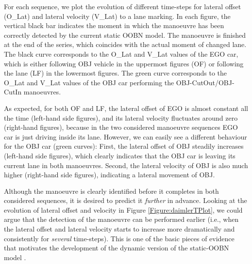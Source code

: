 For each sequence, we plot the evolution of different time-steps for lateral offset (O\_Lat) and lateral velocity (V\_Lat) to a lane marking. In each figure, the vertical black bar indicates the moment in which the manoeuvre has been correctly detected by the current static OOBN model. The manoeuvre is finished at the end of the series, which coincides with the actual moment of changed lane. The black curve corresponds to the O\_Lat and V\_Lat values of the EGO car, which is either following OBJ vehicle in the uppermost figures (OF) or following the lane (LF) in the lowermost figures. The green curve corresponds to the O\_Lat and V\_Lat  values of the OBJ car performing the OBJ-CutOut/OBJ-CutIn manoeuvres. 

As expected, for both OF and LF, the lateral offset of EGO is almost constant all the time (left-hand side figures), and its lateral velocity fluctuates around zero (right-hand figures), because in the two considered manoeuvre sequences EGO car is just driving inside its lane. However, we can easily see a different behaviour for the OBJ car (green curves): First, the lateral offset of OBJ steadily increases (left-hand side figures), which clearly indicates that the OBJ car is leaving its current lane in both manoeuvres. Second, the lateral velocity of OBJ is also much higher (right-hand side figures), indicating a lateral movement of OBJ. 

Although the manoeuvre is clearly identified before it completes in both considered sequences, it is desired to predict it \textit{further} in advance. Looking at the evolution of lateral offset and velocity in Figure \ref{Figure:daimlerTPlot}, we could argue that the detection of the manoeuvre can be performed earlier (i.e., when the lateral offset and lateral velocity starts to increase more dramatically and consistently for \textit{several} time-steps). This is one of the basic pieces of evidence that motivates the development of the dynamic version of the static-OOBN model \cite{Weidl2014}. 

